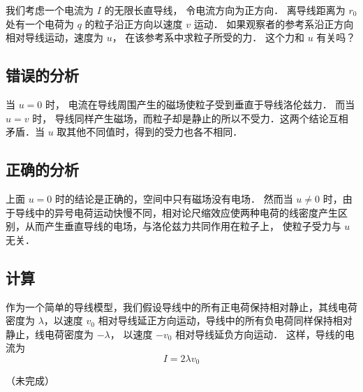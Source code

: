 

我们考虑一个电流为 $I$ 的无限长直导线， 令电流方向为正方向． 离导线距离为 $r_0$ 处有一个电荷为 $q$ 的粒子沿正方向以速度 $v$ 运动． 如果观察者的参考系沿正方向相对导线运动，速度为 $u$， 在该参考系中求粒子所受的力． 这个力和 $u$ 有关吗？


\subsection{错误的分析}
当 $u = 0$ 时， 电流在导线周围产生的磁场使粒子受到垂直于导线洛伦兹力． 而当 $u = v$ 时， 导线同样产生磁场，而粒子却是静止的所以不受力．这两个结论互相矛盾．当 $u$ 取其他不同值时，得到的受力也各不相同．

\subsection{正确的分析}
上面 $u = 0$ 时的结论是正确的，空间中只有磁场没有电场． 然而当 $u \ne 0$ 时，由于导线中的异号电荷运动快慢不同，相对论尺缩效应使两种电荷的线密度产生区别，从而产生垂直导线的电场，与洛伦兹力共同作用在粒子上， 使粒子受力与 $u$ 无关．

\subsection{计算}
作为一个简单的导线模型，我们假设导线中的所有正电荷保持相对静止，其线电荷密度为 $\lambda$，以速度 $v_0$ 相对导线延正方向运动，导线中的所有负电荷同样保持相对静止，线电荷密度为 $-\lambda$， 以速度 $-v_0$ 相对导线延负方向运动． 这样，导线的电流为
\begin{equation}
I = 2\lambda v_0
\end{equation}

（未完成）
